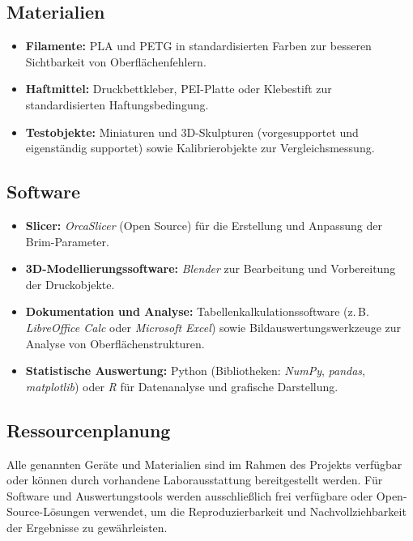 \subsection{Materialien}

\begin{itemize}
  \item \textbf{Filamente:} PLA und PETG in standardisierten Farben zur besseren Sichtbarkeit von Oberflächenfehlern.
  \item \textbf{Haftmittel:} Druckbettkleber, PEI-Platte oder Klebestift zur standardisierten Haftungsbedingung.
  \item \textbf{Testobjekte:} Miniaturen und 3D-Skulpturen (vorgesupportet und eigenständig supportet) sowie Kalibrierobjekte zur Vergleichsmessung.
\end{itemize}

\subsection{Software}

\begin{itemize}
  \item \textbf{Slicer:} \textit{OrcaSlicer} (Open Source) für die Erstellung und Anpassung der Brim-Parameter.
  \item \textbf{3D-Modellierungssoftware:} \textit{Blender} zur Bearbeitung und Vorbereitung der Druckobjekte.
  \item \textbf{Dokumentation und Analyse:} Tabellenkalkulationssoftware (z.\,B. \textit{LibreOffice Calc} oder \textit{Microsoft Excel}) sowie Bildauswertungswerkzeuge zur Analyse von Oberflächenstrukturen.
  \item \textbf{Statistische Auswertung:} Python (Bibliotheken: \textit{NumPy}, \textit{pandas}, \textit{matplotlib}) oder \textit{R} für Datenanalyse und grafische Darstellung.
\end{itemize}

\subsection{Ressourcenplanung}

Alle genannten Geräte und Materialien sind im Rahmen des Projekts verfügbar oder können durch vorhandene Laborausstattung bereitgestellt werden.  
Für Software und Auswertungstools werden ausschließlich frei verfügbare oder Open-Source-Lösungen verwendet, um die Reproduzierbarkeit und Nachvollziehbarkeit der Ergebnisse zu gewährleisten.
